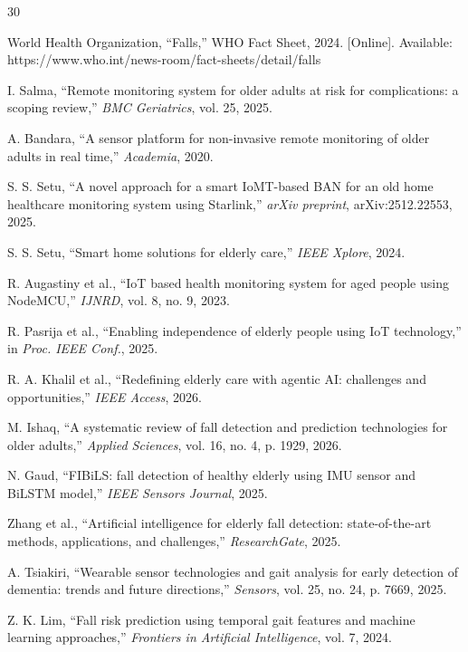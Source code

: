 \documentclass[conference]{IEEEtran}
\begin{document}
\begin{thebibliography}{30}

World Health Organization, ``Falls,'' WHO Fact Sheet, 2024. [Online]. Available: https://www.who.int/news-room/fact-sheets/detail/falls

I. Salma, ``Remote monitoring system for older adults at risk for complications: a scoping review,'' \textit{BMC Geriatrics}, vol. 25, 2025.

A. Bandara, ``A sensor platform for non-invasive remote monitoring of older adults in real time,'' \textit{Academia}, 2020.

S. S. Setu, ``A novel approach for a smart IoMT-based BAN for an old home healthcare monitoring system using Starlink,'' \textit{arXiv preprint}, arXiv:2512.22553, 2025.

S. S. Setu, ``Smart home solutions for elderly care,'' \textit{IEEE Xplore}, 2024.

R. Augastiny et al., ``IoT based health monitoring system for aged people using NodeMCU,'' \textit{IJNRD}, vol. 8, no. 9, 2023.

R. Pasrija et al., ``Enabling independence of elderly people using IoT technology,'' in \textit{Proc. IEEE Conf.}, 2025.

R. A. Khalil et al., ``Redefining elderly care with agentic AI: challenges and opportunities,'' \textit{IEEE Access}, 2026.

M. Ishaq, ``A systematic review of fall detection and prediction technologies for older adults,'' \textit{Applied Sciences}, vol. 16, no. 4, p. 1929, 2026.

N. Gaud, ``FIBiLS: fall detection of healthy elderly using IMU sensor and BiLSTM model,'' \textit{IEEE Sensors Journal}, 2025.

Zhang et al., ``Artificial intelligence for elderly fall detection: state-of-the-art methods, applications, and challenges,'' \textit{ResearchGate}, 2025.

A. Tsiakiri, ``Wearable sensor technologies and gait analysis for early detection of dementia: trends and future directions,'' \textit{Sensors}, vol. 25, no. 24, p. 7669, 2025.

Z. K. Lim, ``Fall risk prediction using temporal gait features and machine learning approaches,'' \textit{Frontiers in Artificial Intelligence}, vol. 7, 2024.


\end{thebibliography}
\end{document}
